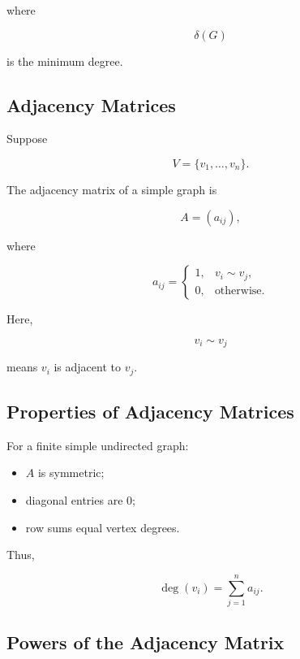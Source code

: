 where

\[
\delta(G)
\]

is the minimum degree.

\subsection{Adjacency Matrices}
\label{subsec:adjacency-matrices}

Suppose

\[
V=\{v_1,\ldots,v_n\}.
\]

The adjacency matrix of a simple graph is

\[
A=(a_{ij}),
\]

where

\[
\boxed{
a_{ij}
=
\begin{cases}
1,&v_i\sim v_j,\\
0,&\text{otherwise}.
\end{cases}
}
\]

Here,

\[
v_i\sim v_j
\]

means \(v_i\) is adjacent to \(v_j\).

\subsection{Properties of Adjacency Matrices}
\label{subsec:adjacency-matrix-properties}

For a finite simple undirected graph:

\begin{itemize}
    \item \(A\) is symmetric;
    \item diagonal entries are \(0\);
    \item row sums equal vertex degrees.
\end{itemize}

Thus,

\[
\boxed{
\deg(v_i)
=
\sum_{j=1}^{n}a_{ij}.
}
\]

\subsection{Powers of the Adjacency Matrix}
\label{subsec:powers-adjacency-matrix}

